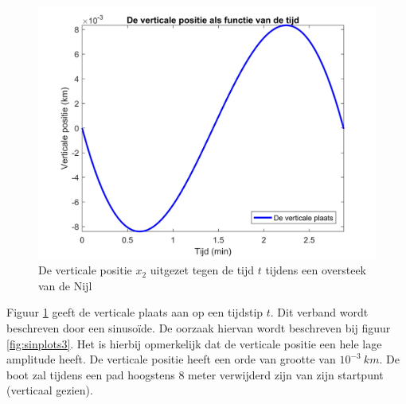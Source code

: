 \begin{figure}[H]
	\centering
	\includegraphics[width=\textwidth]{Sin_yt_2.jpg}
	\caption{De verticale positie \(x_2\) uitgezet tegen de tijd \(t\) tijdens een oversteek van de Nijl}\label{fig:sinplots2}
\end{figure}
Figuur \ref{fig:sinplots2} geeft de verticale plaats aan op een tijdstip \(t\).
Dit verband wordt beschreven door een sinuso\"ide.
De oorzaak hiervan wordt beschreven bij figuur \ref{fig:sinplots3}.
Het is hierbij opmerkelijk dat de verticale positie een hele lage amplitude heeft.
De verticale positie heeft een orde van grootte van \(10^{-3}~km\).
De boot zal tijdens een pad hoogstens 8 meter verwijderd zijn van zijn startpunt (verticaal gezien).

